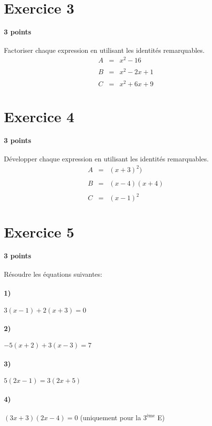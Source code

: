 \documentclass[a4paper]{article}
\begin{document}
  \section*{Exercice 3}
  \paragraph{3 points}
  Factoriser chaque expression en utilisant les identités remarquables.
  \[
    \begin{array}{rcl}
      A &=& x^2 - 16\\\\
      B &=& x^2 - 2x + 1\\\\
      C &=& x^2 + 6x + 9
    \end{array}
  \]

  \section*{Exercice 4}
  \paragraph{3 points}
  Développer chaque expression en utilisant les identités remarquables.
  \[
    \begin{array}{rcl}
      A &=& (x + 3)^2)\\\\
      B &=& (x - 4)(x + 4)\\\\
      C &=& (x - 1)^2
    \end{array}
  \]

  \section*{Exercice 5}
  \paragraph{3 points}
  Résoudre les équations suivantes:
  \paragraph{1)} $3(x - 1) + 2(x + 3) = 0$
  \paragraph{2)} $-5(x + 2) + 3(x - 3) = 7$
  \paragraph{3)} $5(2x - 1) = 3(2x + 5)$
  \paragraph{4)} $(3x + 3)(2x - 4) = 0$ \quad (uniquement pour la $3^\text{ème}$ E)
\end{document}
